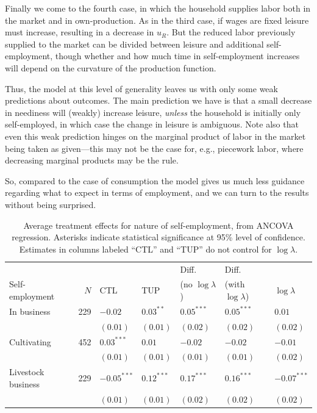 \documentclass[12pt,letterpaper]{article}
\begin{document}
Finally we come to the fourth case, in which the household supplies
labor both in the market and in own-production.   As in the third case, if wages are
fixed leisure must increase, resulting in a decrease in \(u_R\).  But
the reduced labor previously supplied to the market can be divided
between leisure and additional self-employment, though whether and how
much time in self-employment increases will depend on the curvature of
the production function.

Thus, the model at this level of generality leaves us with only some
weak predictions about outcomes.  The main prediction we
have is that a small decrease in neediness will (weakly) increase
leisure, \emph{unless} the household is initially only self-employed, in
which case the change in leisure is ambiguous.  Note also that even
this weak prediction hinges on the marginal product of labor in the
market being taken as given---this may not be the case for, e.g.,
piecework labor, where decreasing marginal products may be the rule.

So, compared to the case of consumption the model gives us much less
guidance regarding what to expect in terms of employment, and we can turn
to the results without being surprised.  

\begin{table}[htb]
\caption{\label{tab:orgtable4}
Average treatment effects for nature of self-employment, from ANCOVA regression. Asterisks indicate statistical significance at 95\% level of confidence.  Estimates in columns labeled ``CTL'' and ``TUP'' do not control for \(\log\lambda\).}
\centering
\begin{tabular}{lrlllll}
 &  &  &  & Diff. & Diff. & \\
Self-employment & \(N\) & CTL & TUP & (no \(\log\lambda\)) & (with \(\log\lambda\)) & \(\log\lambda\)\\
\hline
In business & 229 & \(-0.02\) & \(0.03^{**}\) & \(0.05^{***}\) & \(0.05^{***}\) & \(0.01\)\\
 &  & \((0.01)\) & \((0.01)\) & \((0.02)\) & \((0.02)\) & \((0.02)\)\\
Cultivating & 452 & \(0.03^{***}\) & \(0.01\) & \(-0.02\) & \(-0.02\) & \(-0.01\)\\
 &  & \((0.01)\) & \((0.01)\) & \((0.01)\) & \((0.01)\) & \((0.02)\)\\
Livestock business & 229 & \(-0.05^{***}\) & \(0.12^{***}\) & \(0.17^{***}\) & \(0.16^{***}\) & \(-0.07^{***}\)\\
 &  & \((0.01)\) & \((0.01)\) & \((0.02)\) & \((0.02)\) & \((0.02)\)\\
\end{tabular}
\end{table}
\end{document}
